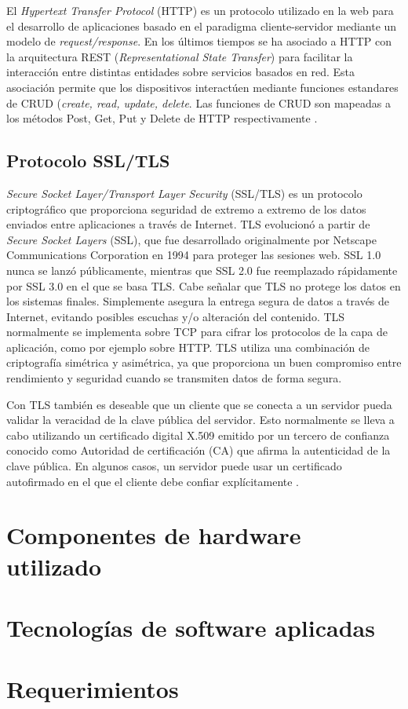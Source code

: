 El \textit{Hypertext Transfer Protocol} (HTTP)\citep{http:1} es un protocolo utilizado en la web para el desarrollo de aplicaciones basado en el paradigma cliente-servidor mediante un modelo de \textit{request/response}. En los últimos tiempos se ha asociado a HTTP con la arquitectura REST (\textit{Representational State Transfer})\citep{rest} para facilitar la interacción entre distintas entidades sobre servicios basados en red. Esta asociación permite que los dispositivos interactúen mediante funciones estandares de CRUD (\textit{create, read, update, delete}\citep{10.1145/3292674}. Las funciones de CRUD son mapeadas a los métodos Post, Get, Put y Delete de HTTP respectivamente \citep{GLAROUDIS2020107037}. 

\subsection{Protocolo SSL/TLS}
\label{sec:Protocolo SSL/TLS}
\textit{Secure Socket Layer/Transport Layer Security} (SSL/TLS) \citep{tls:1} es un protocolo criptográfico que proporciona seguridad de extremo a extremo de los datos enviados entre aplicaciones a través de Internet.
TLS evolucionó a partir de \textit{Secure Socket Layers} (SSL), que fue desarrollado originalmente por Netscape Communications Corporation en 1994 para proteger las sesiones web. SSL 1.0 nunca se lanzó públicamente, mientras que SSL 2.0 fue reemplazado rápidamente por SSL 3.0 en el que se basa TLS.
Cabe señalar que TLS no protege los datos en los sistemas finales. Simplemente asegura la entrega segura de datos a través de Internet, evitando posibles escuchas y/o alteración del contenido.
TLS normalmente se implementa sobre TCP para cifrar los protocolos de la capa de aplicación, como por ejemplo sobre HTTP.
TLS utiliza una combinación de criptografía simétrica y asimétrica, ya que proporciona un buen compromiso entre rendimiento y seguridad cuando se transmiten datos de forma segura.

Con TLS también es deseable que un cliente que se conecta a un servidor pueda validar la veracidad de la clave pública del servidor. Esto normalmente se lleva a cabo utilizando un certificado digital X.509 \citep{x509:1} emitido por un tercero de confianza conocido como Autoridad de certificación (CA) que afirma la autenticidad de la clave pública. En algunos casos, un servidor puede usar un certificado autofirmado en el que el cliente debe confiar explícitamente \citep{tls:2}.

\section{Componentes de hardware utilizado}
\label{sec:Hardware utilizado}

\section{Tecnologías de software aplicadas}
\label{sec:Software aplicado}

\section{Requerimientos}
\label{sec:Requerimientos}

